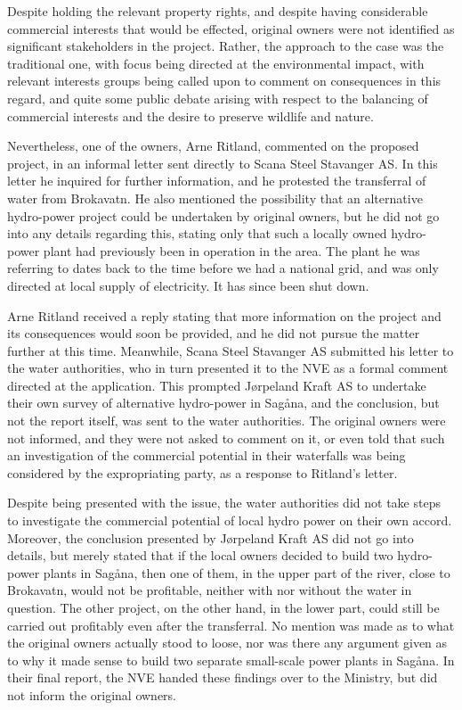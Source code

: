 Despite holding the relevant property rights, and despite having considerable commercial interests that would be effected, original owners were not identified as significant stakeholders in the project. Rather, the approach to the case was the traditional one, with focus being directed at the environmental impact, with relevant interests groups being called upon to comment on consequences in this regard, and quite some public debate arising with respect to the balancing of commercial interests and the desire to preserve wildlife and nature.

Nevertheless, one of the owners, Arne Ritland, commented on the proposed project, in an informal letter sent directly to Scana Steel Stavanger AS. In this letter he inquired for further information, and he protested the transferral of water from Brokavatn. He also mentioned the possibility that an alternative hydro-power project could be undertaken by original owners, but he did not go into any details regarding this, stating only that such a locally owned hydro-power plant had previously been in operation in the area. The plant he was referring to dates back to the time before we had a national grid, and was only directed at local supply of electricity. It has since been shut down.

Arne Ritland received a reply stating that more information on the project and its consequences would soon be provided, and he did not pursue the matter further at this time. Meanwhile, Scana Steel Stavanger AS submitted his letter to the water authorities, who in turn presented it to the NVE as a formal comment directed at the application. This prompted Jørpeland Kraft AS to undertake their own survey of alternative hydro-power in Sagåna, and the conclusion, but not the report itself, was sent to the water authorities. The original owners were not informed, and they were not asked to comment on it, or even told that such an investigation of the commercial potential in their waterfalls was being considered by the expropriating party, as a response to Ritland's letter.

Despite being presented with the issue, the water authorities did not take steps to investigate the commercial potential of local hydro power on their own accord. Moreover, the conclusion presented by Jørpeland Kraft AS did not go into details, but merely stated that if the local owners decided to build two hydro-power plants in Sagåna, then one of them, in the upper part of the river, close to Brokavatn, would not be profitable, neither with nor without the water in question. The other project, on the other hand, in the lower part, could still be carried out profitably even after the transferral. No mention was made as to what the original owners actually stood to loose, nor was there any argument given as to why it made sense to build two separate small-scale power plants in Sagåna. In their final report, the NVE handed these findings over to the Ministry, but did not inform the original owners. 

